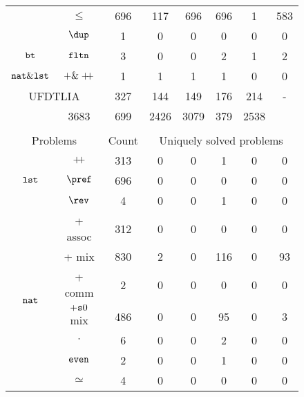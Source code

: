 \begin{figure}
\begin{tabular}[c]{c|c|c|c|c|c|c|c}
		& $\leq$ & 696 & \cellcolor{blue!8!white}117 & \cellcolor{blue!50!white}696 & \cellcolor{blue!50!white}696 & \cellcolor{blue!0!white}1 & \cellcolor{blue!41!white}583\\
		& $\dup$ & 1 & \cellcolor{blue!0!white}0 & \cellcolor{blue!0!white}0 & \cellcolor{blue!0!white}0 & \cellcolor{blue!0!white}0 & \cellcolor{blue!0!white}0\\
		\hline
		\multirow{1}{*}{$\mathtt{bt}$} & $\mathtt{fltn}$ & 3 & \cellcolor{blue!0!white}0 & \cellcolor{blue!0!white}0 & \cellcolor{blue!33!white}2 & \cellcolor{blue!16!white}1 & \cellcolor{blue!33!white}2\\
		\hline
		\multirow{1}{*}{$\mathtt{nat}\&\mathtt{lst}$} & $+\&\mathrel{ +\hspace{-1mm}+ }$ & 1 & \cellcolor{blue!50!white}1 & \cellcolor{blue!50!white}1 & \cellcolor{blue!50!white}1 & \cellcolor{blue!0!white}0 & \cellcolor{blue!0!white}0\\
		\hline
		\multicolumn{2}{c|}{UFDTLIA} & 327 & \cellcolor{blue!22!white}144 & \cellcolor{blue!22!white}149 & \cellcolor{blue!26!white}176 & \cellcolor{blue!32!white}214 & -\\
		\hhline{|=|=|=|=|=|=|=|=|}
		\multicolumn{2}{c|}{All} & 3683 & \cellcolor{blue!9!white}699 & \cellcolor{blue!33!white}2426 & \cellcolor{blue!42!white}3079 & \cellcolor{blue!5!white}379 & \cellcolor{blue!38!white}2538\\
		\hline
		\multicolumn{8}{c}{ }\\
		\hline
		\multicolumn{2}{c|}{Problems} & Count & \multicolumn{5}{c}{Uniquely solved problems} \\ \hline
		\multirow{3}{*}{$\mathtt{lst}$} & $\mathrel{ +\hspace{-1mm}+ }$ & 313 & 0 & 0 & \cellcolor{gray!20!white}1 & 0 & 0\\
		& $\pref$ & 696 & 0 & 0 & 0 & 0 & 0\\
		& $\rev$ & 4 & 0 & 0 & \cellcolor{gray!20!white}1 & 0 & 0\\
		\hline
		\multirow{9}{*}{$\mathtt{nat}$} & + assoc & 312 & 0 & 0 & 0 & 0 & 0\\
		& + mix & 830 & \cellcolor{gray!20!white}2 & 0 & \cellcolor{gray!20!white}116 & 0 & \cellcolor{gray!20!white}93\\
		& + comm & 2 & 0 & 0 & 0 & 0 & 0\\
		& $+ \mathtt{s} 0$ mix & 486 & 0 & 0 & \cellcolor{gray!20!white}95 & 0 & \cellcolor{gray!20!white}3\\
		& $\cdot$ & 6 & 0 & 0 & \cellcolor{gray!20!white}2 & 0 & 0\\
		& $\mathtt{even}$ & 2 & 0 & 0 & \cellcolor{gray!20!white}1 & 0 & 0\\
		& $\simeq$ & 4 & 0 & 0 & 0 & 0 & 0\\

\end{tabular}
\end{figure}
